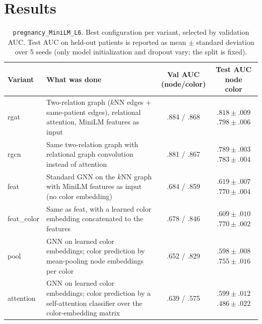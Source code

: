 \documentclass[11pt]{article}
\begin{document}
\section*{Results}
\begin{table}[h!]
\centering
\small
\begin{tabularx}{\textwidth}{lXcc}
\toprule
Variant & What was done & \makecell{Val AUC\\(node/color)} & \makecell{Test AUC\\node\\color} \\
\midrule
rgat       & Two-relation graph ($k$NN edges + same-patient edges), relational attention, MiniLM features as input & .884 / .868 & \makecell{$\mathbf{.818\pm.009}$\\$\mathbf{.798\pm.006}$} \\
rgcn       & Same two-relation graph with relational graph convolution instead of attention & .881 / .867 & \makecell{$.789\pm.003$\\$.783\pm.004$} \\
feat       & Standard GNN on the $k$NN graph with MiniLM features as input (no color embedding) & .684 / .859 & \makecell{$.619\pm.007$\\$.770\pm.004$} \\
feat\_color & Same as feat, with a learned color embedding concatenated to the features & .678 / .846 & \makecell{$.609\pm.010$\\$.770\pm.002$} \\
pool       & GNN on learned color embeddings; color prediction by mean-pooling node embeddings per color & .652 / .829 & \makecell{$.598\pm.008$\\$.755\pm.016$} \\
attention  & GNN on learned color embeddings; color prediction by a self-attention classifier over the color-embedding matrix & .639 / .575 & \makecell{$.599\pm.012$\\$.486\pm.022$} \\
\bottomrule
\end{tabularx}
\caption{\texttt{pregnancy\_MiniLM\_L6}. Best configuration per variant, selected by validation AUC. Test AUC on held-out patients is reported as mean $\pm$ standard deviation over 5 seeds (only model initialization and dropout vary; the split is fixed).}
\end{table}
\end{document}
